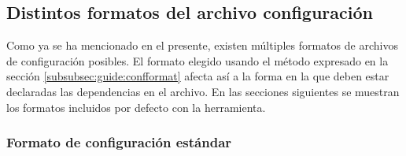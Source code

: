 \subsection{Distintos formatos del archivo configuración}
\label{subsec:formats}

Como ya se ha mencionado en el presente, existen múltiples formatos de archivos
de configuración posibles. El formato elegido usando el método expresado en la
sección \ref{subsubsec:guide:confformat} afecta así a la forma en la que deben
estar declaradas las dependencias en el archivo. En las secciones siguientes
se muestran los formatos incluidos por defecto con la herramienta.

\subsubsection{Formato de configuración estándar}
\label{subsubsec:formats:standar}

